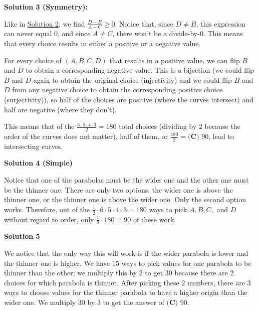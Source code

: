 \begin{enumerate}
 



\textbf{Solution 3 (Symmetry):}

Like in \href{https://artofproblemsolving.com\#Solution\_2\_(Algebra):}{Solution 2}, we find $\frac {D-B}{A-C} \ge 0$. Notice that, since $D \ne B$, this expression can never equal $0$, and since $A \ne C$, there won't be a divide-by-$0$. This means that every choice results in either a positive or a negative value.

 For every choice of $(A,B,C,D)$ that results in a positive value, we can flip $B$ and $D$ to obtain a corresponding negative value. This is a bijection (we could flip $B$ and $D$ again to obtain the original choice (injectivity) and we could flip $B$ and $D$ from any negative choice to obtain the corresponding positive choice (surjectivity)), so half of the choices are positive (where the curves intersect) and half are negative (where they don't).

 This means that of the $\frac{6\cdot5\cdot4\cdot3}{2} = 180$ total choices (dividing by $2$ because the order of the curves does not matter), half of them, or $\frac{180}{2} = \boxed{\textbf{(C) }90}$, lead to intersecting curves.

 



\textbf{Solution 4 (Simple)}

Notice that one of the parabolas must be the wider one and the other one must be the thinner one. There are only two options: the wider one is above the thinner one, or the thinner one is above the wider one. Only the second option works. Therefore, out of the $\frac{1}{2}\cdot 6\cdot 5\cdot 4\cdot 3=180$ ways to pick $A, B, C,$ and $D$ without regard to order, only $\frac{1}{2}\cdot 180=90$ of these work.

 



\textbf{Solution 5}

We notice that the only way this will work is if the wider parabola is lower and the thinner one is higher. We have $15$ ways to pick values for one parabola to be thinner than the other; we multiply this by $2$ to get $30$ because there are $2$ choices for which parabola is thinner. After picking these $2$ numbers, there are $3$ ways to choose values for the thinner parabola to have a higher origin than the wider one. We multiply $30$ by $3$ to get the answer of $\boxed{\textbf{(C) }90}$.

 



\end{enumerate}
